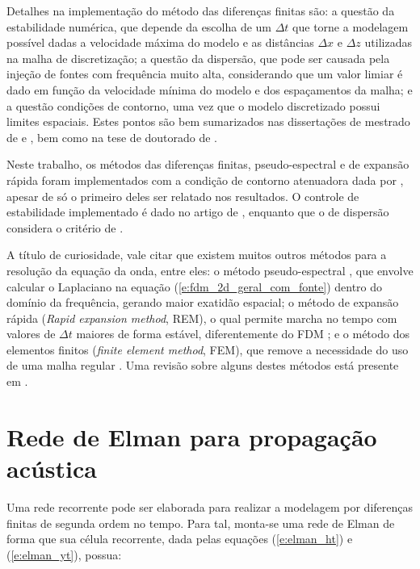     Detalhes na implementação do método das diferenças finitas são: a questão da estabilidade numérica, que depende da escolha de um $\Delta t$ que torne a modelagem possível dadas a velocidade máxima do modelo e as distâncias $\Delta x$ e $\Delta z$ utilizadas na malha de discretização; a questão da dispersão, que pode ser causada pela injeção de fontes com frequência muito alta, considerando que um valor limiar é dado em função da velocidade mínima do modelo e dos espaçamentos da malha; e a questão condições de contorno, uma vez que o modelo discretizado possui limites espaciais. Estes pontos são bem sumarizados nas dissertações de mestrado de  e , bem como na tese de doutorado de .

    Neste trabalho, os métodos das diferenças finitas, pseudo-espectral e de expansão rápida foram implementados com a condição de contorno atenuadora dada por , apesar de só o primeiro deles ser relatado nos resultados. O controle de estabilidade implementado é dado no artigo de , enquanto que o de dispersão considera o critério de .

    A título de curiosidade, vale citar que existem muitos outros métodos para a resolução da equação da onda, entre eles: o método pseudo-espectral , que envolve calcular o Laplaciano na equação (\ref{e:fdm_2d_geral_com_fonte}) dentro do domínio da frequência, gerando maior exatidão espacial; o método de expansão rápida (\textit{Rapid expansion method}, REM), o qual permite marcha no tempo com valores de $\Delta t$ maiores de forma estável, diferentemente do FDM ; e o método dos elementos finitos (\textit{finite element method}, FEM), que remove a necessidade do uso de uma malha regular . Uma revisão sobre alguns destes métodos está presente em .

  \section{Rede de Elman para propagação acústica} \label{s:rnn_modelagem}

    Uma rede recorrente pode ser elaborada para realizar a modelagem por diferenças finitas de segunda ordem no tempo. %
    Para tal, monta-se uma rede de Elman de forma que sua célula recorrente, dada pelas equações (\ref{e:elman_ht}) e (\ref{e:elman_yt}), possua:

